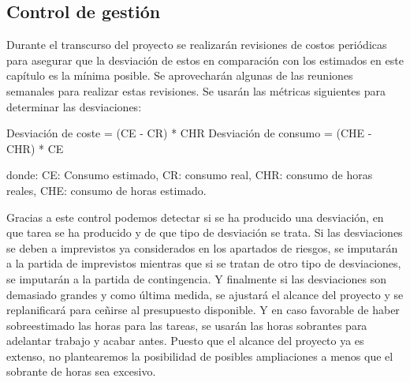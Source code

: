 \subsection{Control de gestión}
Durante el transcurso del proyecto se realizarán revisiones de costos periódicas para asegurar que la desviación de estos en comparación con los estimados en este capítulo es la mínima posible. Se aprovecharán algunas de las reuniones semanales para realizar estas revisiones. Se usarán las métricas siguientes para determinar las desviaciones:

Desviación de coste = (CE - CR) * CHR  
Desviación de consumo = (CHE - CHR) * CE  

donde: CE: Consumo estimado, CR: consumo real, CHR: consumo de horas reales, CHE: consumo de horas estimado.  

Gracias a este control podemos detectar si se ha producido una desviación, en que tarea se ha producido y de que tipo de desviación se trata. Si las desviaciones se deben a imprevistos ya considerados en los apartados de riesgos, se imputarán a la partida de imprevistos mientras que si se tratan de otro tipo de desviaciones, se imputarán a la partida de contingencia. Y finalmente si las desviaciones son demasiado grandes y como última medida, se ajustará el alcance del proyecto y se replanificará para ceñirse al presupuesto disponible. Y en caso favorable de haber sobreestimado las horas para las tareas, se usarán las horas sobrantes para adelantar trabajo y acabar antes. Puesto que el alcance del proyecto ya es extenso, no plantearemos la posibilidad de posibles ampliaciones a menos que el sobrante de horas sea excesivo.